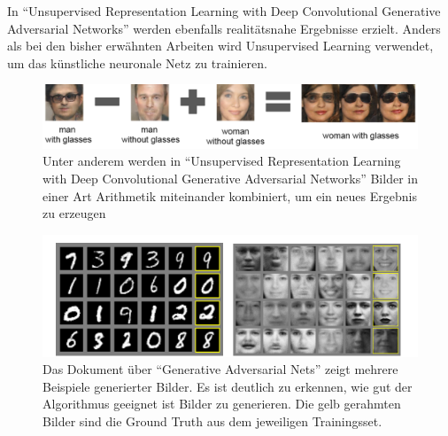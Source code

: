 In ``Unsupervised Representation Learning with Deep Convolutional Generative Adversarial Networks'' \cite{radford2016unsupervised} werden ebenfalls
realitätsnahe Ergebnisse erzielt. Anders als bei den bisher erwähnten Arbeiten
wird Unsupervised Learning verwendet, um das künstliche neuronale Netz zu trainieren.

\begin{figure}[h]
	\centering
	\includegraphics[width=1.0\textwidth]{bilder/image_arithmetic.png}
	\caption[Bildarithmetik]{Unter anderem werden in ``Unsupervised Representation Learning with Deep Convolutional Generative Adversarial Networks'' \cite{radford2016unsupervised} Bilder in einer Art Arithmetik miteinander kombiniert, um ein neues Ergebnis zu erzeugen}
	\label{fig:unsupervisedexamples}
\end{figure}

\begin{figure}[h]
	\centering
	\includegraphics[width=1.0\textwidth]{bilder/mnist_faces.png}
	\caption[GAN Beispielbilder]{Das Dokument über ``Generative Adversarial Nets'' zeigt mehrere Beispiele generierter Bilder. Es ist deutlich zu erkennen, wie gut der Algorithmus geeignet ist Bilder zu generieren. Die gelb gerahmten Bilder sind die Ground Truth aus dem jeweiligen Trainingsset.}
	\label{fig:ganexamples}
\end{figure}

\pagebreak

